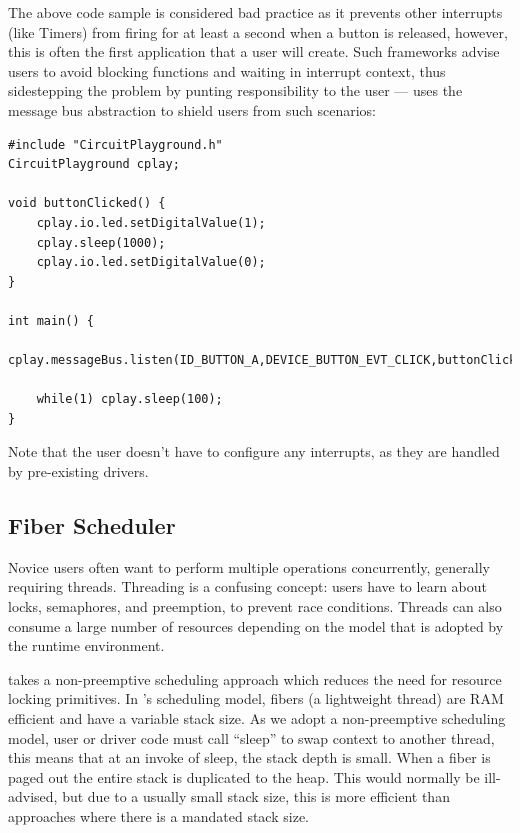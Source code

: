 The above code sample is considered bad practice as it prevents other interrupts (like Timers) from firing for at least a second when a button is released, however, this is often the first application that a user will create. Such frameworks advise users to avoid blocking functions and waiting in interrupt context, thus sidestepping the problem by punting responsibility to the user --- \CO uses the message bus abstraction to shield users from such scenarios:

\begin{lstlisting}
#include "CircuitPlayground.h"
CircuitPlayground cplay;

void buttonClicked() {
    cplay.io.led.setDigitalValue(1);
    cplay.sleep(1000);
    cplay.io.led.setDigitalValue(0);
}

int main() {
    cplay.messageBus.listen(ID_BUTTON_A,DEVICE_BUTTON_EVT_CLICK,buttonClicked);

    while(1) cplay.sleep(100);
}
\end{lstlisting}

Note that the user doesn't have to configure any interrupts, as they are handled by pre-existing drivers.


\subsection{Fiber Scheduler}

Novice users often want to perform multiple operations concurrently, generally requiring threads. Threading is a confusing concept: users have to learn about locks, semaphores, and preemption, to prevent race conditions. Threads can also consume a large number of resources depending on the model that is adopted by the runtime environment.

\CO takes a non-preemptive scheduling approach which reduces the need for resource locking primitives. In \CON's scheduling model, fibers (a lightweight thread) are RAM efficient and have a variable stack size. As we adopt a non-preemptive scheduling model, user or driver code must call ``sleep'' to swap context to another thread, this means that at an invoke of sleep, the stack depth is small. When a fiber is paged out the entire stack is duplicated to the heap. This would normally be ill-advised, but due to a usually small stack size, this is more efficient than approaches where there is a mandated stack size.

